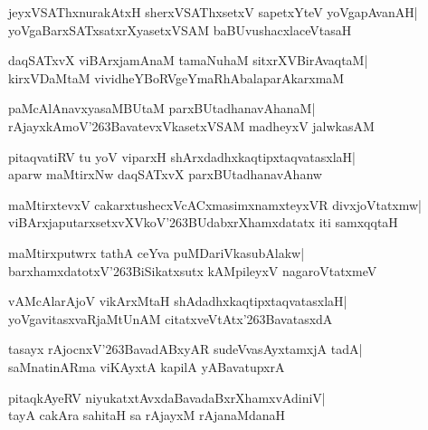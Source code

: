 \documentclass[twoside,12pt,openright]{book}
\def\S{\char'263}
\newcounter{shloka}[chapter]
\begin{document}
\begin{shloka}%
jeyxVSAThxnurakAtxH sherxVSAThxsetxV sapetxYteV yoVgapAvanAH|\\
yoVgaBarxSATxsatxrXyasetxVSAM baBUvushacxlaceVtasaH
\end{shloka}

\begin{shloka}%
daqSATxvX viBArxjamAnaM tamaNuhaM sitxrXVBirAvaqtaM|\\
kirxVDaMtaM vividheYBoRVgeYmaRhAbalaparAkarxmaM
\end{shloka}

\begin{shloka}%
paMcAlAnavxyasaMBUtaM parxBUtadhanavAhanaM|\\
rAjayxkAmoV\S BavatevxVkasetxVSAM madheyxV jalwkasAM
\end{shloka}

\begin{shloka}%
pitaqvatiRV tu yoV viparxH shArxdadhxkaqtipxtaqvatasxlaH|\\
aparw maMtirxNw daqSATxvX parxBUtadhanavAhanw
\end{shloka}

\begin{shloka}%
maMtirxtevxV cakarxtushecxVcACxmasimxnamxteyxVR divxjoVtatxmw|\\
viBArxjaputarxsetxvXVkoV\S BUdabxrXhamxdatatx iti samxqqtaH
\end{shloka}

\begin{shloka}%
maMtirxputwrx tathA ceYva puMDariVkasubAlakw|\\
barxhamxdatotxV\S BiSikatxsutx kAMpileyxV nagaroVtatxmeV
\end{shloka}

\begin{shloka}%
vAMcAlarAjoV vikArxMtaH shAdadhxkaqtipxtaqvatasxlaH|\\
yoVgavitasxvaRjaMtUnAM citatxveVtAtx\S BavatasxdA
\end{shloka}

\begin{shloka}%
tasayx rAjocnxV\S BavadABxyAR sudeVvasAyxtamxjA tadA|\\
saMnatinARma viKAyxtA kapilA yABavatupxrA
\end{shloka}

\begin{shloka}%
pitaqkAyeRV niyukatxtAvxdaBavadaBxrXhamxvAdiniV|\\
tayA cakAra sahitaH sa rAjayxM rAjanaMdanaH
\end{shloka}
\end{document}
